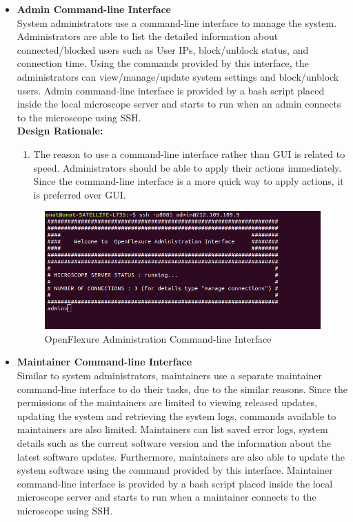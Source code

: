 \begin{itemize}
\begin{figure}[H]
			\label{fig:user_web_interface}
		\end{figure}
		\item \textbf{Admin Command-line Interface} \\
		System administrators use a command-line interface to manage the system. Administrators are able to list the detailed information about connected/blocked users such as User IPs, block/unblock status, and connection time. Using the commands provided by this interface, the administrators can view/manage/update system settings and block/unblock users. Admin command-line interface is provided by a bash script placed inside the local microscope server and starts to run when an admin connects to the microscope using SSH. \\
		\textbf{Design Rationale:} 
		\begin{enumerate}
			\item The reason to use a command-line interface rather than GUI is related to speed. Administrators should be able to apply their actions immediately. Since the command-line interface is a more quick way to apply actions, it is preferred over GUI.
		\end{enumerate}
		\begin{figure}[H]
			\centering
			\includegraphics[scale=0.5]{Figures/admin_interface}
			\caption{OpenFlexure Administration Command-line Interface}
			\label{fig:system_admin_management_interface}
		\end{figure}
		\item \textbf{Maintainer Command-line Interface} \\
		Similar to system administrators, maintainers use a separate maintainer command-line interface to do their tasks, due to the similar reasons. Since the permissions of the maintainers are limited to viewing released updates, updating the system and retrieving the system logs, commands available to maintainers are also limited. Maintainers can list saved error logs, system details such as the current software version and the information about the latest software updates. Furthermore, maintainers are also able to update the system software using the command provided by this interface. Maintainer command-line interface is provided by a bash script placed inside the local microscope server and starts to run when a maintainer connects to the microscope using SSH.
	\end{itemize}
